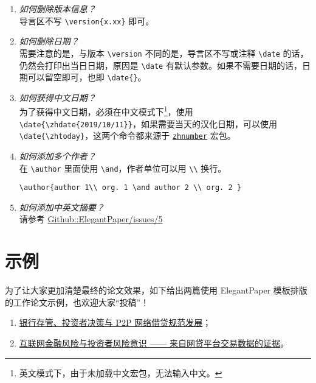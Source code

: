 \documentclass[lang=cn,11pt,a4paper]{elegantpaper}
\begin{document}
\begin{enumerate}[label=\arabic*).]
  \item \textit{如何删除版本信息？}\\
      导言区不写 \lstinline|\version{x.xx}| 即可。
  \item \textit{如何删除日期？}\\
      需要注意的是，与版本 \lstinline{\version} 不同的是，导言区不写或注释 \lstinline{\date} 的话，仍然会打印出当日日期，原因是 \lstinline{\date} 有默认参数。如果不需要日期的话，日期可以留空即可，也即 \lstinline|\date{}|。
  \item \textit{如何获得中文日期？}\\
      为了获得中文日期，必须在中文模式下\footnote{英文模式下，由于未加载中文宏包，无法输入中文。}，使用 \lstinline|\date{\zhdate{2019/10/11}}|，如果需要当天的汉化日期，可以使用 \lstinline|\date{\zhtoday}|，这两个命令都来源于 \href{https://ctan.org/pkg/zhnumber}{\lstinline{zhnumber}} 宏包。
  \item \textit{如何添加多个作者？}\\
      在 \lstinline{\author} 里面使用 \lstinline{\and}，作者单位可以用 \lstinline{\\} 换行。\begin{lstlisting}
\author{author 1\\ org. 1 \and author 2 \\ org. 2 }
\end{lstlisting}
  \item \textit{如何添加中英文摘要？}\\
      请参考 \href{https://github.com/ElegantLaTeX/ElegantPaper/issues/5}{Github::ElegantPaper/issues/5}
\end{enumerate}

\section{示例}

为了让大家更加清楚最终的论文效果，如下给出两篇使用 ElegantPaper 模板排版的工作论文示例，也欢迎大家“投稿”！

\begin{enumerate}
  \item \href{https://github.com/EthanDeng/bank-custody}{银行存管、投资者决策与 P2P 网络借贷规范发展}；
  \item \href{https://github.com/EthanDeng/risk-awareness}{互联网金融风险与投资者风险意识 —— 来自网贷平台交易数据的证据}。
\end{enumerate}
\end{document}
